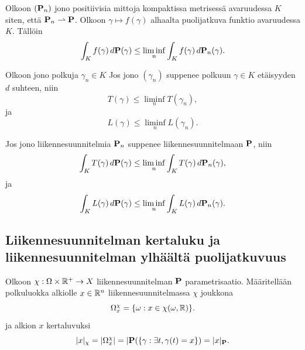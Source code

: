 \begin{lemma}
    Olkoon $(\P_n)$ jono positiivisia mittoja kompaktissa metrisessä avaruudessa $K$ siten, että $\P_n \rightharpoonup \P$. Olkoon $\gamma \mapsto f(\gamma)$ alhaalta puolijatkuva funktio avaruudessa $K$. Tällöin
    \begin{equation*}
        \int_K f(\gamma) \, d\P(\gamma) \le \liminf_n \int_K f(\gamma) \, d\P_n(\gamma).
    \end{equation*}
\end{lemma}

\begin{lemma}
    Olkoon jono polkuja $\gamma_n \in K$ Jos jono $(\gamma_n)$ suppenee polkuun $\gamma \in K$ etäisyyden $d$ suhteen, niin
    \begin{equation*}
        T(\gamma) \le \liminf_n T(\gamma_n),
    \end{equation*}
    ja 
    \begin{equation*}
        L(\gamma) \le \liminf_n L(\gamma_n).
    \end{equation*}
\end{lemma}

\begin{lemma}
    Jos jono liikennesuunnitelmia $\P_n$ suppenee liikennesuunnitelmaan $\P$, niin 
    \begin{equation*}
        \int_K T(\gamma) \, d\P(\gamma) \le \liminf_n \int_K T(\gamma) \, d\P_n(\gamma),
    \end{equation*}
    ja
    \begin{equation*}
        \int_K L(\gamma) \, d\P(\gamma) \le \liminf_n \int_K L(\gamma) \, d\P_n(\gamma).
    \end{equation*}
\end{lemma}

\subsection{Liikennesuunnitelman kertaluku ja liikennesuunnitelman ylhäältä puolijatkuvuus}

\begin{definition}
Olkoon $\chi : \Omega \times \R^+ \to X$ liikennesuunnitelman $\P$ parametrisaatio. Määritellään polkuluokka alkiolle $x\in \R^n$ liikennesuunnitelmassa $\chi$ joukkona
\begin{equation*}
    \Omega_x^\chi = \{\omega : x \in \chi(\omega, \R)\}.
\end{equation*}
ja alkion $x$ kertaluvuksi
    \begin{equation*}
        |x|_\chi = |\Omega_x^\chi| = |\P(\{\gamma : \exists t, \gamma(t) = x\}) = |x|_\P.
    \end{equation*}
\end{definition}

